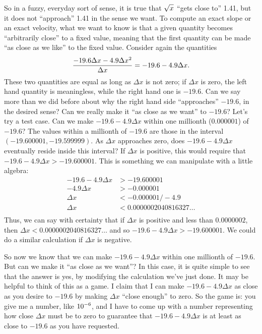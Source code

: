 So in a fuzzy,
everyday sort of sense, it is true that $\displaystyle \sqrt{x}$ ``gets close to''
1.41, but it does not ``approach'' 1.41 in the sense we want. To
compute an exact slope or an exact velocity, what we want to know is that
a given quantity becomes ``arbitrarily close'' to a fixed value,
meaning that the first quantity can be made ``as close as we like'' to
the fixed value. Consider again the quantities
$${-19.6\Delta x-4.9\Delta x^2\over \Delta x}=-19.6-4.9\Delta x.
$$
These two quantities are equal as long as $\Delta x$ is not zero; if
$\Delta x$ is zero, the left hand quantity is meaningless, while the
right hand one is $-19.6$. Can we say more than we did before about
why the right hand side ``approaches'' $-19.6$, in the desired sense?
Can we really make it ``as close as we want'' to $-19.6$? Let's try a
test case. Can we make $-19.6-4.9\Delta x$ within one millionth
($0.000001$) of $-19.6$? The values within a millionth of $-19.6$ are
those in the interval $(-19.600001,-19.599999)$. As $\Delta x$
approaches zero, does $-19.6-4.9\Delta x$ eventually reside inside
this interval? If $\Delta x$ is positive, this would require that
$-19.6-4.9\Delta x> -19.600001$. This is something we can manipulate
with a little algebra:
\begin{align*}
-19.6-4.9\Delta x&> -19.600001 \\
-4.9\Delta x&>-0.000001 \\
\Delta x&<-0.000001/-4.9 \\
\Delta x&<0.0000002040816327\ldots \\
\end{align*}
Thus, we can say with certainty that if $\Delta x$ is positive and
less than $0.0000002$, then $\Delta x < 0.0000002040816327\ldots$ and
so $-19.6-4.9\Delta x > -19.600001$. We could do a similar calculation
if $\Delta x$ is negative.

So now we know that we can make $-19.6-4.9\Delta x$ within one
millionth of $-19.6$. But can we make it ``as close as we want''?
In this case, it is quite simple to see that the answer is yes, by
modifying the calculation we've just done. It may be helpful to think
of this as a game. I claim that I can make $-19.6-4.9\Delta x$ as
close as you desire to $-19.6$ by making $\Delta x$ ``close enough''
to zero. So the game is: you give me a number, like $\displaystyle 10^{-6}$, and I
have to come up with a number representing how close $\Delta x$ must
be to zero to guarantee that $-19.6-4.9\Delta x$ is at least as close
to $-19.6$ as you have requested. 

